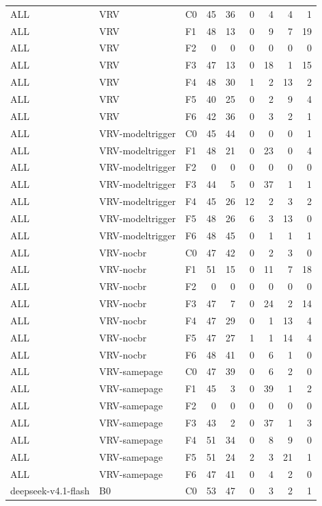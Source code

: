 \begin{tabular}{lllrrrrrr}
ALL & VRV & C0 & 45 & 36 & 0 & 4 & 4 & 1 \\
ALL & VRV & F1 & 48 & 13 & 0 & 9 & 7 & 19 \\
ALL & VRV & F2 & 0 & 0 & 0 & 0 & 0 & 0 \\
ALL & VRV & F3 & 47 & 13 & 0 & 18 & 1 & 15 \\
ALL & VRV & F4 & 48 & 30 & 1 & 2 & 13 & 2 \\
ALL & VRV & F5 & 40 & 25 & 0 & 2 & 9 & 4 \\
ALL & VRV & F6 & 42 & 36 & 0 & 3 & 2 & 1 \\
ALL & VRV-modeltrigger & C0 & 45 & 44 & 0 & 0 & 0 & 1 \\
ALL & VRV-modeltrigger & F1 & 48 & 21 & 0 & 23 & 0 & 4 \\
ALL & VRV-modeltrigger & F2 & 0 & 0 & 0 & 0 & 0 & 0 \\
ALL & VRV-modeltrigger & F3 & 44 & 5 & 0 & 37 & 1 & 1 \\
ALL & VRV-modeltrigger & F4 & 45 & 26 & 12 & 2 & 3 & 2 \\
ALL & VRV-modeltrigger & F5 & 48 & 26 & 6 & 3 & 13 & 0 \\
ALL & VRV-modeltrigger & F6 & 48 & 45 & 0 & 1 & 1 & 1 \\
ALL & VRV-nocbr & C0 & 47 & 42 & 0 & 2 & 3 & 0 \\
ALL & VRV-nocbr & F1 & 51 & 15 & 0 & 11 & 7 & 18 \\
ALL & VRV-nocbr & F2 & 0 & 0 & 0 & 0 & 0 & 0 \\
ALL & VRV-nocbr & F3 & 47 & 7 & 0 & 24 & 2 & 14 \\
ALL & VRV-nocbr & F4 & 47 & 29 & 0 & 1 & 13 & 4 \\
ALL & VRV-nocbr & F5 & 47 & 27 & 1 & 1 & 14 & 4 \\
ALL & VRV-nocbr & F6 & 48 & 41 & 0 & 6 & 1 & 0 \\
ALL & VRV-samepage & C0 & 47 & 39 & 0 & 6 & 2 & 0 \\
ALL & VRV-samepage & F1 & 45 & 3 & 0 & 39 & 1 & 2 \\
ALL & VRV-samepage & F2 & 0 & 0 & 0 & 0 & 0 & 0 \\
ALL & VRV-samepage & F3 & 43 & 2 & 0 & 37 & 1 & 3 \\
ALL & VRV-samepage & F4 & 51 & 34 & 0 & 8 & 9 & 0 \\
ALL & VRV-samepage & F5 & 51 & 24 & 2 & 3 & 21 & 1 \\
ALL & VRV-samepage & F6 & 47 & 41 & 0 & 4 & 2 & 0 \\
deepseek-v4.1-flash & B0 & C0 & 53 & 47 & 0 & 3 & 2 & 1 \\

\end{tabular}

